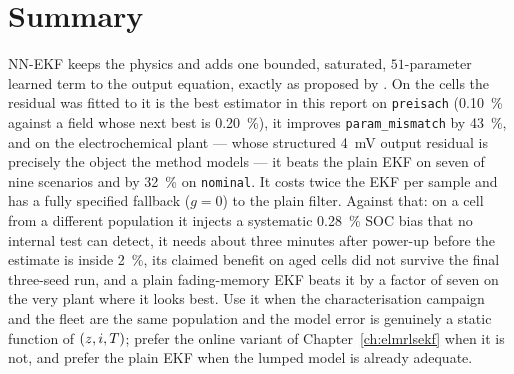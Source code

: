 \section{Summary}
NN-EKF keeps the physics and adds one bounded, saturated, $\num{51}$-parameter learned term to the
output equation, exactly as proposed by \citet{charkhgard2010nnekf}.  On the cells the residual was
fitted to it is the best estimator in this report on \texttt{preisach}
(\SI{0.10}{\percent} against a field whose next best is \SI{0.20}{\percent}), it improves
\texttt{param\_mismatch} by \SI{43}{\percent}, and on the electrochemical plant --- whose structured
\SI{4}{\milli\volt} output residual is precisely the object the method models --- it beats the
plain EKF on seven of nine scenarios and by \SI{32}{\percent} on \texttt{nominal}.  It costs twice
the EKF per sample and has a fully specified fallback ($g = 0$) to the plain filter.  Against that:
on a cell from a different population it injects a systematic \SI{0.28}{\percent} SOC bias that no
internal test can detect, it needs about three minutes after power-up before the estimate is inside
\SI{2}{\percent}, its claimed benefit on aged cells did not survive the final three-seed run, and a
plain fading-memory EKF beats it by a factor of seven on the very plant where it looks best.  Use
it when the characterisation campaign and the fleet are the same population and the model error is
genuinely a static function of $(z,i,T)$; prefer the online variant of
Chapter~\ref{ch:elmrlsekf} when it is not, and prefer the plain EKF when the lumped model is
already adequate.
